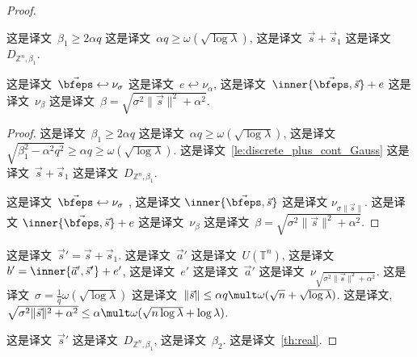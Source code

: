 \begin{proof}
\begin{claim}
\label{cl:real_right_side}  这是译文~$\beta_1 \geq 2 \alpha q$ 这是译文~$\alpha q \geq \omega ( \sqrt{\log \lambda})$, 这是译文~$\vec{s} + \vec{s}_1$ 这是译文~$D_{\mathbb{Z}^n,\beta_1} $.

这是译文~$\vec{\bfeps} \hookleftarrow \nu_{\sigma}$ 这是译文~$e \hookleftarrow \nu_{\alpha}$, 这是译文~$ \inner{\vec{\bfeps},\vec{s}} + e$ 这是译文~$\nu_{\beta}$ 这是译文~$\beta=\sqrt{\sigma^2\|\vec{s}\|^2+ \alpha^2}$.

\end{claim}

\begin{proof}
 这是译文~$\beta_1 \geq 2 \alpha q$ 这是译文~$\alpha q \geq \omega ( \sqrt{\log \lambda})$, 这是译文~$\sqrt{\beta_1^2 - \alpha^2 q^2} \geq \alpha q \geq \omega ( \sqrt{\log \lambda})$. 这是译文~\ref{le:discrete_plus_cont_Gauss} 这是译文~$\vec{s} + \vec{s}_1$ 这是译文~$D_{\mathbb{Z}^n,\beta_1} $.


这是译文~$\vec{\bfeps} \hookleftarrow \nu_{\sigma}$ , 这是译文 $\inner{\vec{\bfeps},\vec{s}}$ 这是译文  $\nu_{\sigma\|\vec{s}\|}$. 这是译文 $ \inner{\vec{\bfeps},\vec{s}} + e$ 这是译文~$\nu_{\beta}$ 这是译文~$\beta=\sqrt{\sigma^2\|\vec{s}\|^2+ \alpha^2}$.
\end{proof}

这是译文~$\vec{s}' = \vec{s} + \vec{s}_1$. 这是译文~$\vec{a}'$ 这是译文~$U(\mathbb{T}^n)$, 这是译文~$b' = \inner{\vec{a}',\vec{s}'} + e'$, 这是译文~$e'$ 这是译文~$\vec{a}'$ 这是译文~$\nu_{\sqrt{\sigma^2\|\vec{s}\|^2+ \alpha^2}}$. 这是译文~$\sigma = \frac{1}{q} \omega (\sqrt{\log \lambda})$ 这是译文~$ \Vert \vec{s} \Vert \leq \alpha q \mult \omega(\sqrt{n} + \sqrt{\log \lambda})$. 这是译文, $\sqrt{\sigma^2\|\vec{s}\|^2+ \alpha^2} \leq \alpha \mult \omega(\sqrt{n \log \lambda} + \log \lambda)$.

这是译文~$\vec{s}'$ 这是译文~$D_{\mathbb{Z}^n,\beta_1}$, 这是译文~$\beta_2$. 这是译文~\ref{th:real}.


\end{proof}

